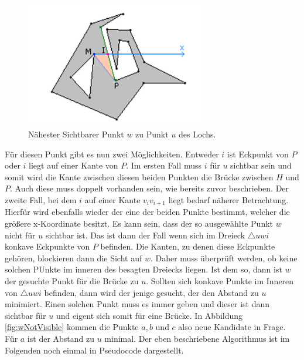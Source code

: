 \begin{figure}[h]
  \centering
  \includegraphics[width=0.7\textwidth]{bilder/bridgefindigwithray.png}
  \caption[Brücken finden mittels Sichtlinie]{\centering Nähester Sichtbarer Punkt $w$ zu Punkt $u$ des Lochs. \cite{eberly}}
  \label{fig:bridgeray}
\end{figure}

Für diesen Punkt gibt es nun zwei Möglichkeiten. Entweder $i$ ist Eckpunkt von $P$ oder $i$ liegt auf einer Kante von $P$.
Im ersten Fall muss $i$ für $u$ sichtbar sein und somit wird die Kante zwischen diesen beiden Punkten die Brücke zwischen $H$ und $P$. Auch diese muss doppelt vorhanden sein, wie bereits zuvor beschrieben.
Der zweite Fall, bei dem $i$ auf einer Kante $v_iv_{i+1}$ liegt bedarf näherer Betrachtung. Hierfür wird ebenfalls wieder der eine der beiden Punkte bestimmt, welcher die größere x-Koordinate besitzt. 
Es kann sein, dass der so ausgewählte Punkt $w$ nicht für $u$ sichtbar ist. Das ist dann der Fall wenn sich im Dreieck $\triangle uwi$ konkave Eckpunkte von $P$ befinden. Die Kanten, zu denen diese Eckpunkte gehören, blockieren dann die Sicht auf $w$.
Daher muss überprüft werden, ob keine solchen PUnkte im inneren des besagten Dreiecks liegen. Ist dem so, dann ist $w$ der gesuchte Punkt für die Brücke zu $u$. Sollten sich konkave Punkte im Inneren von $\triangle uwi$ befinden, dann wird der jenige gesucht, 
der den Abstand zu $u$ minimiert. Einen solchen Punkt muss es immer geben und dieser ist dann sichtbar für $u$ und eigent sich somit für eine Brücke.
In Abbildung \ref{fig:wNotVisible} kommen die Punkte $a,b$ und $c$ also neue Kandidate in Frage. Für $a$ ist der Abstand zu $u$ minimal. Der eben beschriebene Algorithmus ist im Folgenden noch einmal in Pseudocode dargestellt.

